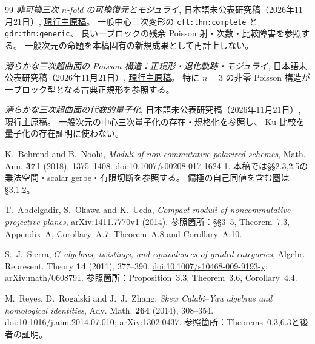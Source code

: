 \documentclass[11pt,a4paper]{ltjsarticle}
\numberwithin{equation}{section}
\begin{document}
\begin{thebibliography}{99}
\emph{非可換三次 $n$-fold の可換復元とモジュライ},
日本語未公表研究稿（2026年11月21日）,
\href{https://github.com/uedakazushi/nc-cubic/blob/main/papers/nc-cubic.tex}{現行主原稿}。
一般中心三次変形の \texttt{cft:thm:complete} と \texttt{gdr:thm:generic}、
良い一ブロックの残余 Poisson 射・次数・比較障害を参照する。
一般次元の命題を本稿固有の新規成果として再計上しない。

\emph{滑らかな三次超曲面の Poisson 構造：正規形・退化軌跡・モジュライ},
日本語未公表研究稿（2026年11月21日）,
\href{https://github.com/uedakazushi/poisson-cubic/blob/main/papers/poisson-cubic.tex}{現行主原稿}。
特に $n=3$ の非零 Poisson 構造が一ブロック型となる古典正規形を参照する。

\emph{滑らかな三次超曲面の代数的量子化},
日本語未公表研究稿（2026年11月21日）,
\href{https://github.com/uedakazushi/cubic-quantization/blob/main/papers/cubic-quantization.tex}{現行主原稿}。
一般次元の中心三次量子化の存在・規格化を参照し、
Ku 比較を量子化の存在証明に使わない。


K.~Behrend and B.~Noohi,
\emph{Moduli of non-commutative polarized schemes},
Math. Ann. \textbf{371} (2018), 1375--1408.
\href{https://doi.org/10.1007/s00208-017-1624-1}{doi:10.1007/s00208-017-1624-1}.
本稿では\S\S2.3,2.5の乗法空間・scalar gerbe・有限切断を参照する。
偏極の自己同値を含む圏は\S3.1.2。

T.~Abdelgadir, S.~Okawa and K.~Ueda,
\emph{Compact moduli of noncommutative projective planes},
\href{https://arxiv.org/abs/1411.7770v1}{arXiv:1411.7770v1} (2014).
参照箇所：\S\S3--5, Theorem~7.3, Appendix~A, Corollary~A.7, Theorem~A.8 and Corollary~A.10.

S.~J.~Sierra,
\emph{$G$-algebras, twistings, and equivalences of graded categories},
Algebr. Represent. Theory \textbf{14} (2011), 377--390.
\href{https://doi.org/10.1007/s10468-009-9193-y}{doi:10.1007/s10468-009-9193-y};
\href{https://arxiv.org/abs/math/0608791}{arXiv:math/0608791}.
参照箇所：Proposition~3.3, Theorem~3.6, Corollary~4.4.

M.~Reyes, D.~Rogalski and J.~J.~Zhang,
\emph{Skew Calabi--Yau algebras and homological identities},
Adv. Math. \textbf{264} (2014), 308--354.
\href{https://doi.org/10.1016/j.aim.2014.07.010}{doi:10.1016/j.aim.2014.07.010};
\href{https://arxiv.org/abs/1302.0437}{arXiv:1302.0437}.
参照箇所：Theorems~0.3,6.3と後者の証明。


\end{thebibliography}
\end{document}
